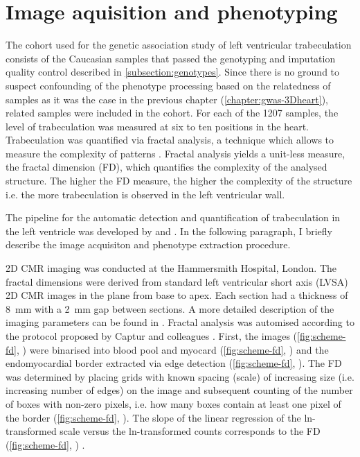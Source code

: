 \section{Image aquisition and phenotyping}
The cohort used for the genetic association study of left ventricular trabeculation consists of the Caucasian samples that passed the genotyping and imputation quality control described in \cref{subsection:genotypes}. Since there is no ground to suspect confounding of the phenotype processing based on the relatedness of samples as it was the case in the previous chapter (\cref{chapter:gwas-3Dheart}), related samples were included in the cohort. For each of the \num{1207} samples, the level of trabeculation was measured at six to ten positions in the heart. Trabeculation was quantified via fractal analysis, a technique which allows to measure the complexity of patterns \citep{Eke2002}. Fractal analysis yields a unit-less measure, the fractal dimension (FD), which quantifies the complexity of the analysed structure. The higher the FD measure, the higher the complexity of the structure i.e. the more trabeculation is observed in the left ventricular wall. 

The pipeline for the automatic detection and quantification of trabeculation in the left ventricle was developed by  and . In the following paragraph, I briefly describe the image acquisiton and phenotype extraction procedure. 

2D CMR imaging was conducted at the Hammersmith Hospital, London. The fractal dimensions were derived from standard left ventricular short axis (LVSA) 2D CMR images in the plane from base to apex. Each section had a thickness of \num{8}~mm with a \num{2}~mm gap between sections. A more detailed description of the imaging parameters can be found in \citep{DeMarvao2014}. Fractal analysis was automised according to the protocol proposed by Captur and colleagues \citeyearpar{Captur2013}. First, the images (\cref{fig:scheme-fd}, ) were binarised into blood pool and myocard (\cref{fig:scheme-fd}, ) and the endomyocardial border extracted via edge detection (\cref{fig:scheme-fd}, ). The FD was determined by placing grids with known spacing (scale) of increasing size (i.e. increasing number of edges) on the image and subsequent counting of the number of boxes with non-zero pixels, i.e. how many boxes contain at least one pixel of the border (\cref{fig:scheme-fd}, ). The slope of the linear regression of the ln-transformed scale versus the ln-transformed counts corresponds to the FD (\cref{fig:scheme-fd}, ) \citep{Captur2013}.

